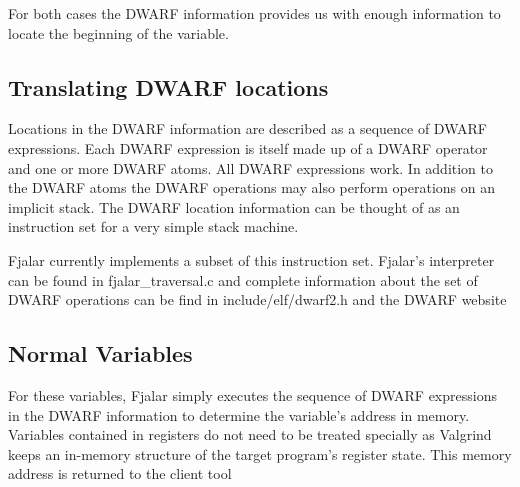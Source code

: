 \documentclass[11pt]{article}
\begin{document}
For both cases the DWARF information provides us with enough
information to locate the beginning of the variable.

\subsection{Translating DWARF locations}
Locations in the DWARF information are described as a sequence of
DWARF expressions. Each DWARF expression is itself made up of a DWARF
operator and one or more DWARF atoms. All DWARF expressions work. In
addition to the DWARF atoms the DWARF operations may also perform
operations on an implicit stack. The DWARF location information can be
thought of as an instruction set for a very simple stack machine.

Fjalar currently implements a subset of this instruction set. Fjalar's
interpreter can be found in fjalar\_traversal.c and complete
information about the set of DWARF operations can be find in
include/elf/dwarf2.h and the DWARF website %

\subsection{Normal Variables}
For these variables, Fjalar simply executes the sequence of DWARF
expressions in the DWARF information to determine the variable's
address in memory. Variables contained in registers do not need to be treated
specially as Valgrind keeps an in-memory structure of the target
program's register state. This memory address is returned to the
client tool

\sub



\end{document}
